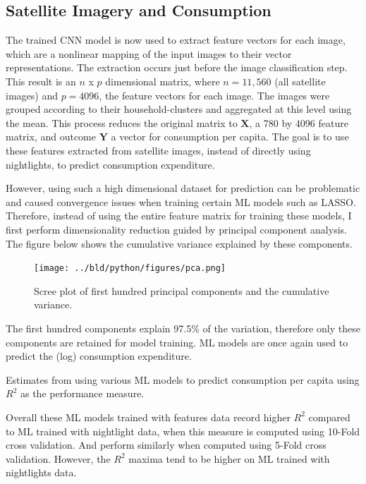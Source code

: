 \documentclass[11pt, a4paper, leqno]{article}
\begin{document}
\subsection{Satellite Imagery and Consumption}

\noindent The trained CNN model is now used to extract feature vectors for each image, which are a nonlinear mapping of the input images to their vector representations. The extraction occurs just before the image classification step. This result is an $n$ x $p$ dimensional matrix, where $n = 11,560$ (all satellite images) and $p = 4096$, the feature vectors for each image. The images were grouped according to their household-clusters and aggregated at this level using the mean. This process reduces the original matrix to $\textbf{X}$, a 780 by 4096 feature matrix, and outcome $\textbf{Y}$ a vector for consumption per capita. The goal is to use these features extracted from satellite images, instead of directly using nightlights, to predict consumption expenditure.

\noindent However, using such a high dimensional dataset for prediction can be problematic and caused convergence issues when training certain ML models such as LASSO. Therefore, instead of using the entire feature matrix for training these models, I first perform dimensionality reduction guided by principal component analysis. The figure below shows the cumulative variance explained by these components. 

\begin{figure}[H]
\centering
    \texttt{[image: ../bld/python/figures/pca.png]}
    \caption{Scree plot of first hundred principal components and the cumulative variance.}
    \label{fig:python-predictions}
\end{figure}

\noindent The first hundred components explain 97.5\% of the variation, therefore only these components are retained for model training. ML models are once again used to predict the (log) consumption expenditure.

\begin{table}[H]
\centering
    \scalebox{1.1}{}
	\caption{Estimates from using various ML models to predict consumption per capita using $R^2$ as the performance measure.}
\end{table}

\noindent Overall these ML models trained with features data record higher $R^2$  compared to ML trained with nightlight data, when this measure is computed using 10-Fold cross validation. And perform similarly when computed using 5-Fold cross validation. However, the $R^2$ maxima tend to be higher on ML trained with nightlights data. 
\end{document}
